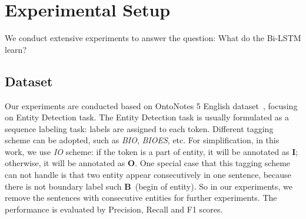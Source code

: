 \documentclass{article}
\begin{document}

\section{Experimental Setup}

We conduct extensive experiments to answer the question: What do the Bi-LSTM learn? 


\subsection{Dataset} Our experiments are conducted based on OntoNotes 5 English dataset~\cite{weischedel2012ontonotes}, focusing on Entity Detection task. The Entity Detection task is usually formulated as a sequence labeling task: labels are assigned to each token. Different tagging scheme can be adopted, such as \textit{BIO}, \textit{BIOES}, etc. For simplification, in this work, we use \textit{IO} scheme: if the token is a part of entity, it will be annotated as \textbf{I}; otherwise, it will be annotated as \textbf{O}. One special case that this tagging scheme can not handle is that two entity appear consecutively in one sentence, because there is not boundary label such \textbf{B}~(begin of entity). So in our experiments, we remove the sentences with consecutive entities for further experiments. The performance is evaluated by Precision, Recall and F1 scores.
\end{document}
